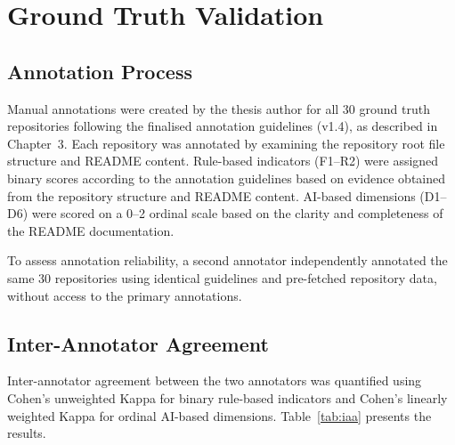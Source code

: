 \section{Ground Truth Validation}

\subsection{Annotation Process}

Manual annotations were created by the thesis author for all 30 
ground truth repositories following the finalised annotation 
guidelines (v1.4), as described in Chapter~3. Each repository was 
annotated by examining the repository root file structure and README 
content. Rule-based indicators (F1--R2) were assigned binary scores 
according to the annotation guidelines based on evidence obtained 
from the repository structure and README content. AI-based dimensions 
(D1--D6) were scored on a 0--2 ordinal scale based on the clarity 
and completeness of the README documentation.

To assess annotation reliability, a second annotator independently 
annotated the same 30 repositories using identical guidelines and 
pre-fetched repository data, without access to the primary 
annotations.

\subsection{Inter-Annotator Agreement}

Inter-annotator agreement between the two annotators was quantified 
using Cohen's unweighted Kappa for binary rule-based indicators and 
Cohen's linearly weighted Kappa for ordinal AI-based dimensions. 
Table~\ref{tab:iaa} presents the results.

